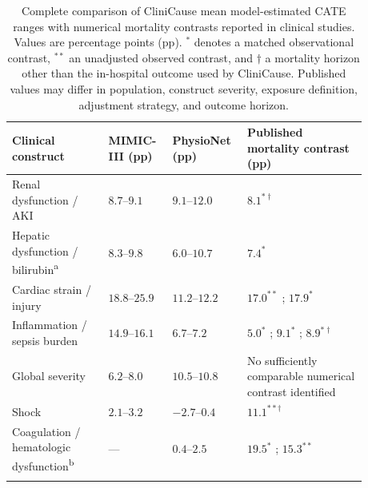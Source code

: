 \documentclass[letterpaper,10pt]{article}
\renewcommand{\arraystretch}{1.08}
\begin{document}
\begin{table}[H]
\centering
\caption{Complete comparison of CliniCause mean model-estimated CATE ranges
with numerical mortality contrasts reported in clinical studies.  Values are
percentage points (pp).  \(^{*}\) denotes a matched observational contrast,
\(^{**}\) an unadjusted observed contrast, and \(\dagger\) a mortality horizon
other than the in-hospital outcome used by CliniCause.  Published values may
differ in population, construct severity, exposure definition, adjustment
strategy, and outcome horizon.}
\label{tab:supp-clinical-corroboration}
\footnotesize
\setlength{\tabcolsep}{4.5pt}
\renewcommand{\arraystretch}{1.17}
\begin{tabular}{p{0.25\linewidth}p{0.16\linewidth}p{0.16\linewidth}p{0.31\linewidth}}
\toprule
Clinical construct &
MIMIC-III (pp) &
PhysioNet (pp) &
Published mortality contrast (pp) \\
\midrule
Renal dysfunction / AKI &
\(8.7\)--\(9.1\) &
\(9.1\)--\(12.0\) &
\(8.1^{*\dagger}\) \cite{jiang2022akiattributable} \\
\addlinespace

Hepatic dysfunction / bilirubin\textsuperscript{a} &
\(8.3\)--\(9.8\) &
\(6.0\)--\(10.7\) &
\(7.4^{*}\) \cite{yang2021bilirubinmortality} \\
\addlinespace

Cardiac strain / injury &
\(18.8\)--\(25.9\) &
\(11.2\)--\(12.2\) &
\(17.0^{**}\) \cite{babuin2008troponin};
\(17.9^{*}\) \cite{lorenteros2020myocardial} \\
\addlinespace

Inflammation / sepsis burden &
\(14.9\)--\(16.1\) &
\(6.7\)--\(7.2\) &
\(5.0^{*}\) \cite{shankarhari2018sepsis};
\(9.1^{*}\) \cite{jia2023sepsisaki};
\(8.9^{*\dagger}\) \cite{arbous2024sepsis} \\
\addlinespace

Global severity &
\(6.2\)--\(8.0\) &
\(10.5\)--\(10.8\) &
No sufficiently comparable numerical contrast identified \\
\addlinespace

Shock &
\(2.1\)--\(3.2\) &
\(-2.7\)--\(0.4\) &
\(11.1^{**\dagger}\) \cite{lamontagne2020permissive} \\
\addlinespace

Coagulation / hematologic dysfunction\textsuperscript{b} &
--- &
\(0.4\)--\(2.5\) &
\(19.5^{*}\) \cite{stephan1999thrombocytopenia};
\(15.3^{**}\) \cite{anthon2023ploticu} \\
\addlinespace


\end{tabular}
\end{table}
\end{document}
